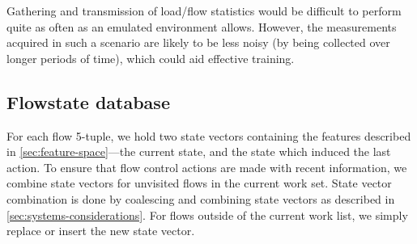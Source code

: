 Gathering and transmission of load/flow statistics would be difficult to perform quite as often as an emulated environment allows.
However, the measurements acquired in such a scenario are likely to be less noisy (by being collected over longer periods of time), which could aid effective training.

\subsection{Flowstate database}
For each flow 5-tuple, we hold two state vectors containing the features described in \cref{sec:feature-space}---the current state, and the state which induced the last action.
To ensure that flow control actions are made with recent information, we combine state vectors for unvisited flows in the current work set.
State vector combination is done by coalescing and combining state vectors as described in \cref{sec:systems-considerations}.
For flows outside of the current work list, we simply replace or insert the new state vector.

%
%
%

